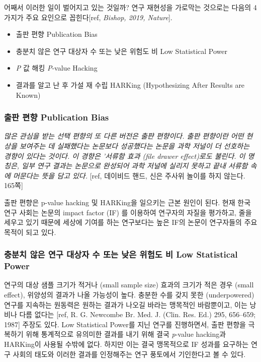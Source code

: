 \documentclass[]{book}
\providecommand{\tightlist}{%
  \setlength{\itemsep}{0pt}\setlength{\parskip}{0pt}}
\begin{document}
어째서 이러한 일이 벌어지고 있는 것일까? 연구 재현성을 가로막는 것으로는 다음의 4가지가 주요 요인으로 꼽힌다{[}ref, \emph{Bishop, 2019, Nature}{]}.

\begin{itemize}
\tightlist
\item
  출판 편향 Publication Bias
\item
  충분치 않은 연구 대상자 수 또는 낮은 위험도 비 Low Statistical Power
\item
  \emph{P} 값 해킹 \emph{P}-value Hacking
\item
  결과를 알고 난 후 가설 재 수립 HARKing (Hypothesizing After Results are Known)
\end{itemize}

\hypertarget{publication-bias}{%
\subsubsection{출판 편향 Publication Bias}\label{publication-bias}}

\emph{많은 관심을 받는 선택 편향의 또 다른 버전은 출퍈 편향이다. 출판 편향이란 어떤 현상을 보여주는 데 실패했다는 논문보다 성공했다는 논문을 과학 저널이 더 선호하는 경향이 있다는 것이다. 이 경향은 '서류함 효과 (file drawer effect)로도 불린다. 이 명칭은, 일부 연구 결과는 논문으로 완성되어 과학 저널에 실리지 못하고 끝내 서류함 속에 머문다는 뜻을 담고 있다.}
{[}ref, 데이비드 핸드, 신은 주사위 놀이를 하지 않는다. 165쪽{]}

출판 편향은 p-value hacking 및 HARKing을 일으키는 근본 원인이 된다. 현재 한국 연구 사회는 논문의 impact factor (IF) 를 이용하여 연구자의 자질을 평가하고, 줄을 세우고 있기 때문에 세상에 기여를 하는 연구보다는 높은 IF의 논문이 연구자들의 주요 목적이 되고 있다.

\hypertarget{low-statistical-power}{%
\subsubsection{충분치 않은 연구 대상자 수 또는 낮은 위험도 비 Low Statistical Power}\label{low-statistical-power}}

연구의 대상 샘플 크기가 적거나 (small sample size) 효과의 크기가 적은 경우 (small effect), 위양성의 결과가 나올 가능성이 높다. 충분한 수를 갖지 못한 (underpowered) 연구를 지속하는 원동력은 원하는 결과가 나오길 바라는 맹목적인 바람뿐이고, 이는 낭비나 다름 없다는 {[}ref, R. G. Newcombe Br. Med. J. (Clin. Res. Ed.) 295, 656--659; 1987{]} 주장도 있다. Low Statistical Power를 지닌 연구를 진행하면서, 출판 편향을 극복하기 위해 통계적으로 유의미한 결과를 내기 위해 결국 \emph{p}-value hacking과 HARKing이 사용될 수밖에 없다. 하지만 이는 결국 맹목적으로 IF 성과를 요구하는 연구 사회의 태도와 이러한 결과를 인정해주는 연구 풍토에서 기인한다고 볼 수 있다.
\end{document}
